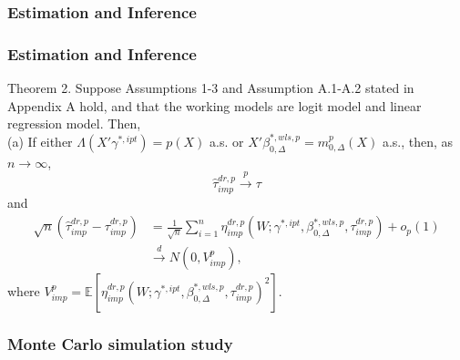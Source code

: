 \documentclass{beamer}
\begin{document}
\begin{frame}\frametitle{Estimation and Inference}\end{frame}

\begin{frame}\frametitle{Estimation and Inference}
    \begin{block}{Theorem 2.}
        Suppose Assumptions 1-3 and Assumption A.1-A.2 stated in Appendix A hold, and that the working models are logit model and linear regression model. Then,
        \\(a) If either $\Lambda(X'\gamma^{\ast,ipt}) = p(X)$ a.s. or $X'\beta^{\ast, wls, p}_{0,\Delta} = m^{p}_{0,\Delta}(X)$ a.s., then, as $n \rightarrow \infty$,
        $$
            \widehat{\tau}^{dr,p}_{imp} \overset{p}{\to} \tau
        $$
        and
        \begin{align*}
            \sqrt{n}(\widehat{\tau}^{dr,p}_{imp} - \tau^{dr,p}_{imp})
            &= 
            \frac{1}{\sqrt{n}}\sum_{i = 1}^{n} \eta^{dr,p}_{imp}(W;\gamma^{\ast,ipt}, \beta^{\ast,wls,p}_{0,\Delta},\tau^{dr,p}_{imp}) + o_{p}(1)
            \\ & \overset{d}{\to} N(0,V^{p}_{imp}),
        \end{align*}
        where $V^{p}_{imp} = \mathbb{E}\left[\eta^{dr,p}_{imp}(W;\gamma^{\ast, ipt},\beta^{\ast, wls, p}_{0, \Delta}, \tau^{dr, p}_{imp})^{2}\right]$.
    \end{block}
\end{frame}


\begin{frame}\frametitle{Monte Carlo simulation study}

\end{frame}


\end{document}
